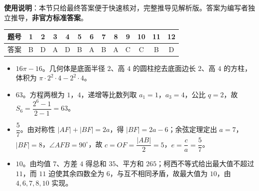 
\begin{gknotice}
\textbf{使用说明}：本节只给最终答案便于快速核对，完整推导见解析版。答案为编写者独立推导，\textbf{非官方标准答案}。
\end{gknotice}

\begin{center}\begin{tabular}{ccccccccccccc}
\toprule
题号 & 1 & 2 & 3 & 4 & 5 & 6 & 7 & 8 & 9 & 10 & 11 & 12 \\
\midrule
答案 & B & D & A & D & B & A & B & A & C & C & B & D \\
\bottomrule
\end{tabular}\end{center}

\begin{itemize}[leftmargin=2.6em]
  \item[\textbf{13.}] $16\pi-16$。几何体是底面半径 $2$、高 $4$ 的圆柱挖去底面边长 $2$、高 $4$ 的方柱，体积为 $\pi\cdot2^2\cdot4-2^2\cdot4$。
  \item[\textbf{14.}] $63$。方程两根为 $1$，$4$，递增等比数列取 $a_1=1$，$a_3=4$，公比 $q=2$，故 $S_6=\dfrac{2^6-1}{2-1}=63$。
  \item[\textbf{15.}] $\dfrac57$。由对称性 $|AF|+|BF|=2a$，得 $|BF|=2a-6$；余弦定理定出 $a=7$，$|BF|=8$，$\angle AFB=90^\circ$，故 $c=OF=\dfrac{|AB|}2=5$，$e=\dfrac ca=\dfrac57$。
  \item[\textbf{16.}] $10$。由均值 $7$、方差 $4$ 得总和 $35$、平方和 $265$；柯西不等式给出最大值不超过 $11$，而 $11$ 迫使其余四数全为 $6$，与互不相同矛盾，故最大值为 $10$，由 $4,6,7,8,10$ 实现。
\end{itemize}

